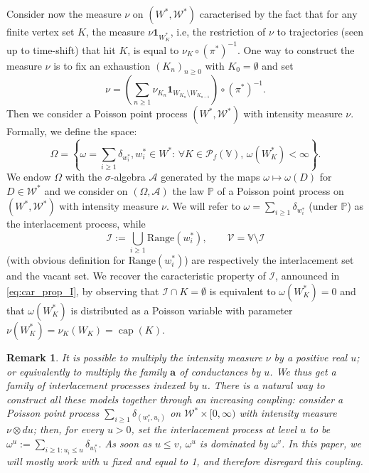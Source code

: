 \documentclass[12pt,a4paper]{article}
\newtheorem{remark}[theo]{Remark}
\newcommand{\1}[1]{{\mathbf 1}{\{#1\}}}
\newcommand{\V}{{\mathcal V}}
\newcommand{\I}{{\mathcal I}}
\newcommand{\bbP}{\mathbb{P}}
\newcommand{\8}{{\infty}}
\newcommand{\ind}{{\mathbf{1}}} %
\newcommand{\capa}{\mathop{\mathrm{cap}}}
\begin{document}
Consider now the measure $\nu$ on $(W^*, \mathcal{W}^*)$ caracterised by the fact that for any finite vertex set $K$, the measure $\nu\ind_{W_K^*}$, i.e, the restriction of $\nu$ to trajectories (seen up to time-shift) that hit $K$, is equal to $\nu_K \circ (\pi^*)^{-1}$. 
One way to construct the measure $\nu$ is to fix an exhaustion $(K_n)_{n\ge 0}$ with $K_0=\emptyset$ and set 
$$\nu = 
\left(\sum_{n\ge 1} \nu_{K_n} \ind_{W_{K_n} \setminus W_{K_{n-1}}} \right)
\circ (\pi^*)^{-1}.$$
Then we consider a Poisson point process $(W^*, \mathcal{W}^*)$ with intensity measure $\nu$. Formally, we define the space:
\begin{equation}\label{eq:def_state_Omega}
  \Omega =  \left\{ \omega = \sum_{i\ge 1} \delta_{w_i^*} ,  w_i^* \in W^* : \, \forall K \in \mathcal{P}_f(\mathbb{V}), \, \omega(W_K^*)<\infty \right\}.
\end{equation}
We endow $\Omega$ with the $\sigma$-algebra $\mathcal{A}$ generated by the maps $\omega \mapsto \omega(D)$ for $D\in \mathcal{W}^*$ 
and we consider on $(\Omega, \mathcal{A})$ the law $\bbP$ of a Poisson point process on $(W^*, \mathcal{W}^*)$ with intensity measure $\nu$. We will refer to $\omega =\sum_{i\ge 1} \delta_{w_i^*} $ (under $\bbP$) as the interlacement process, while 
\begin{equation}
  \I:=\bigcup_{i\ge 1} \text{Range}(w_i^*), \qquad  \V = \mathbb{V} \setminus \I 
\end{equation}
(with obvious definition for $\text{Range}(w_i^*)$) are respectively the interlacement set and the vacant set. 
We recover the caracteristic property of $\I$, announced in \eqref{eq:car_prop_I}, by observing that $\I\cap K=\emptyset$ is equivalent to $\omega(W_K^*)=0$ and that $\omega(W_K^*)$ is distributed as a Poisson variable with parameter $\nu(W_K^*)=\nu_K(W_K)=\capa(K)$. 

\begin{remark}\label{rem:full_interlacement_process}
  It is possible to multiply the intensity measure $\nu$ by a positive real $u$; or equivalently to multiply the family $\mathbf{a}$ of conductances by $u$. 
  We thus get a family of interlacement processes indexed by $u$. 
  There is a natural way to construct all these models together through an increasing coupling: 
  consider a Poisson point process $\sum_{i\ge 1} \delta_{(w_i^*, u_i)}$ on $\mathcal{W}^*\times [0, \infty)$ with intensity measure $\nu \otimes d u$; 
  then, for every $u>0$, set the interlacement process at level $u$ to be  $\omega^u:=\sum_{i\ge 1 : u_i\le u} \delta_{w_i^*}$.
  As soon as $u\le v$, $\omega^u$ is dominated by $\omega^v$. 
  In this paper, we will mostly work with $u$ fixed and equal to 1, and therefore disregard this coupling. 
\end{remark}
\end{document}
